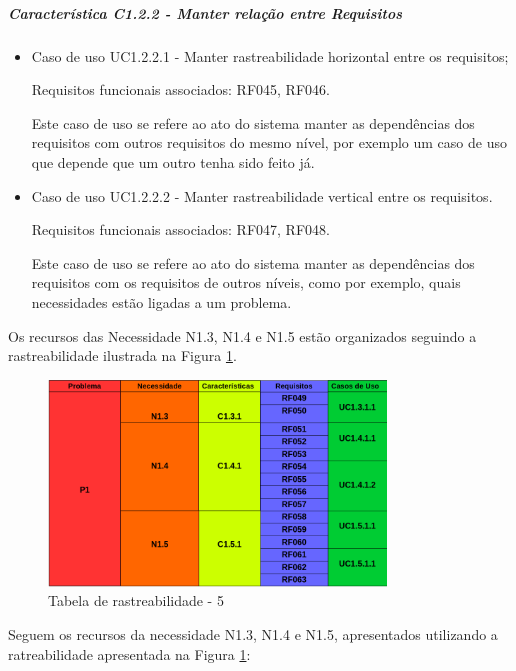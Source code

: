 	\subparagraph{Característica C1.2.2 - Manter relação entre Requisitos}
		\begin{itemize}
			
			\item Caso de uso UC1.2.2.1 - Manter rastreabilidade horizontal entre os requisitos;
					
					Requisitos funcionais associados: RF045, RF046.

					Este caso de uso se refere ao ato do sistema manter as dependências dos requisitos com outros requisitos do mesmo nível, por exemplo um caso de uso que depende que um outro tenha sido feito já.
				
			
			\item Caso de uso UC1.2.2.2 - Manter rastreabilidade vertical entre os requisitos.
					
					Requisitos funcionais associados: RF047, RF048.

					Este caso de uso se refere ao ato do sistema manter as dependências dos requisitos com os requisitos de outros níveis, como por exemplo, quais necessidades estão ligadas a um problema.
		\end{itemize}

Os recursos das Necessidade N1.3, N1.4 e N1.5 estão organizados seguindo a rastreabilidade ilustrada na Figura \ref{img:tabelaParte5}.

\begin{figure}[H]
	\centering
	\includegraphics[width=0.8\textwidth]{imgModelagem/tabelaParte5}
	\caption{Tabela de rastreabilidade - 5 }
	\label{img:tabelaParte5}
\end{figure}

	Seguem os recursos da necessidade N1.3, N1.4 e N1.5, apresentados utilizando a ratreabilidade apresentada na Figura \ref{img:tabelaParte5}:

